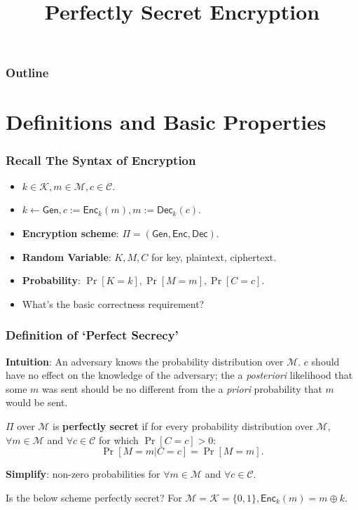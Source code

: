 

\title{Perfectly Secret Encryption}


\maketitle
\begin{frame}\frametitle{Outline}
\tableofcontents
\end{frame}
\section{Definitions and Basic Properties}
\begin{frame}\frametitle{Recall The Syntax of Encryption}
\begin{figure}
\begin{center}

\end{center}
\end{figure}
\begin{itemize}
\item $k \in \mathcal{K}, m \in \mathcal{M}, c \in \mathcal{C}$.
\item $k \gets \mathsf{Gen}, c:= \mathsf{Enc}_k(m), m:= \mathsf{Dec}_k(c)$.
\item \textbf{Encryption scheme}: $\Pi = (\mathsf{Gen}, \mathsf{Enc}, \mathsf{Dec})$.
\item \textbf{Random Variable}: $K, M, C$ for key, plaintext, ciphertext.
\item \textbf{Probability}: $\Pr[K=k], \Pr[M=m], \Pr[C=c].$
\item \alert{What's the basic correctness requirement?}
\end{itemize}
\end{frame}
\begin{frame}\frametitle{Definition of `Perfect Secrecy'}
\textbf{Intuition}: An adversary knows the probability distribution over $\mathcal{M}$. $c$ should have no effect on the knowledge of the adversary; the a \emph{posteriori} likelihood that some $m$ was sent should be no different from the a \emph{priori} probability that $m$ would be sent. 
\begin{definition}
$\Pi$ over $\mathcal{M}$ is \textbf{perfectly secret} if for every probability distribution over $\mathcal{M}$, $\forall m \in \mathcal{M}$ and $\forall c \in \mathcal{C}$ for which $\Pr[C = c] > 0$:
\[ \Pr[M=m | C=c] = \Pr[M=m].\]
\end{definition}
\textbf{Simplify}: non-zero probabilities for $\forall m \in \mathcal{M}$ and $\forall c \in \mathcal{C}$.\\

\begin{exampleblock}{Is the below scheme perfectly secret?}{ For $\mathcal{M}=\mathcal{K} = \{ 0,1 \} , \mathsf{Enc}_k(m)= m \oplus k$.}\end{exampleblock}
\end{frame}

